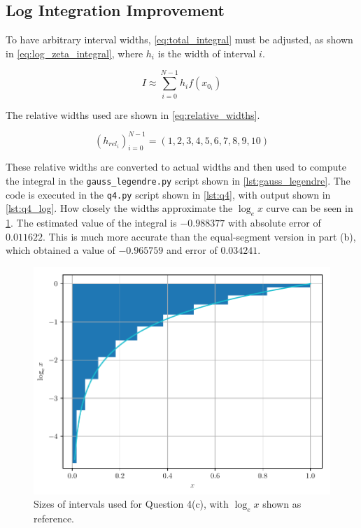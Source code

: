\documentclass[a4paper,titlepage]{article}
\newcommand{\code}[1]{\texttt{#1}}
\begin{document}
	\subsection{Log Integration Improvement}
	
	To have arbitrary interval widths, \cref{eq:total_integral} must be adjusted, as shown in \cref{eq:log_zeta_integral}, where $h_i$ is the width of interval $i$.
	
	\begin{equation} \label{eq:log_zeta_integral}
		I \approx \sum_{i=0}^{N-1} h_i f(x_{0_i}) 
	\end{equation}
	
	The relative widths used are shown in \cref{eq:relative_widths}.
	
	\begin{equation} \label{eq:relative_widths}
		(h_{rel_i})_{i=0}^{N-1} = (1, 2, 3, 4, 5, 6, 7, 8, 9, 10)
	\end{equation}
	
	These relative widths are converted to actual widths and then used to compute the integral in the \code{gauss\_legendre.py} script shown in \cref{lst:gauss_legendre}. The code is executed in the \code{q4.py} script shown in \cref{lst:q4}, with output shown in \cref{lst:q4_log}.	How closely the widths approximate the $\log_e x$ curve can be seen in \cref{fig:q4c}. The estimated value of the integral is $-0.988377$ with absolute error of $0.011622$. This is much more accurate than the equal-segment version in part (b), which obtained a value of $-0.965759$ and error of $0.034241$.
	
	\begin{figure}[!htb]
		\centering
		\includegraphics[width=\columnwidth]{plots/q4c.pdf}
		\caption
		{Sizes of intervals used for Question 4(c), with $\log_e x$ shown as reference.}
		\label{fig:q4c}
	\end{figure}
\end{document}
